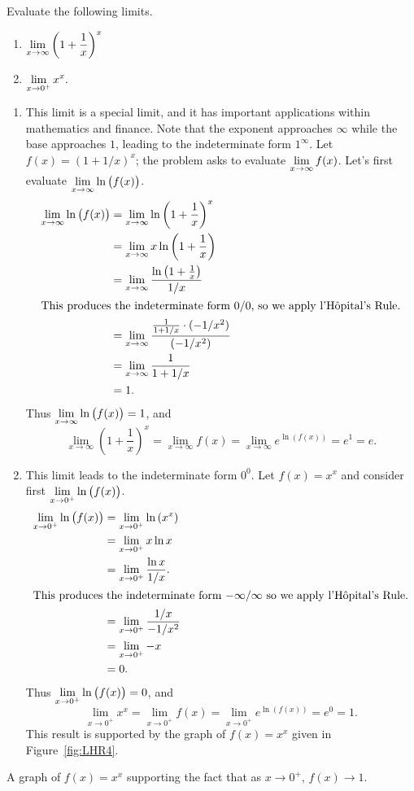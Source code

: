\begin{example} \label{Ex:3.7.Eg2}
Evaluate the following limits.
\bmtwo
\begin{enumerate}[1)]
\item $\displaystyle \lim_{x\to\infty} \left(1+\frac1x\right)^x $
\item $\displaystyle \lim_{x\to0^+} x^x.$
\end{enumerate}
\emtwo

\solution
\begin{enumerate}[1)]
\item	This limit is a special limit, and it has important applications within mathematics and finance. Note that the exponent approaches $\infty$ while the base approaches $1$, leading to the indeterminate form $1^\infty$. Let $f(x) = (1+1/x)^x$; the problem asks to evaluate $\displaystyle\lim_{x\to\infty}f(x)$. Let's first evaluate $\displaystyle \lim_{x\to\infty}\ln\big(f(x)\big)$.
\begin{align*}
\lim_{x\to\infty}\ln\big(f(x)\big) & = \lim_{x\to\infty} \ln \left(1+\frac1x\right)^x \\
			&= \lim_{x\to\infty} x\ln\left(1+\frac1x\right)\\
			&=  \lim_{x\to\infty} \frac{\ln\left(1+\frac1x\right)}{1/x}\\
			\intertext{This produces the indeterminate form $0/0$, so we apply l'H\^opital's Rule.}
			&=	\lim_{x\to\infty} \frac{\frac{1}{1+1/x}\cdot(-1/x^2)}{(-1/x^2)} \\
			&= \lim_{x\to\infty}\frac{1}{1+1/x}\\
			&= 1.
\end{align*}
Thus $\displaystyle\lim_{x\to\infty} \ln \big(f(x)\big) = 1$, and
$$\lim_{x\to\infty}\left(1+\frac1x\right)^x = \lim_{x\to\infty} f(x) =  \lim_{x\to\infty}e^{\ln (f(x))} = e^1 = e.$$

\item	This limit leads to the indeterminate form $0^0$. Let $f(x) = x^x$ and consider first $\displaystyle\lim_{x\to0^+} \ln\big(f(x)\big)$. 
\begin{align*}
\lim_{x\to0^+} \ln\big(f(x)\big) &= \lim_{x\to0^+} \ln\left(x^x\right) \\
			&= \lim_{x\to0^+} x\ln x \\
			&= \lim_{x\to0^+} \frac{\ln x}{1/x}.\\
			\intertext{This produces the indeterminate form $-\infty/\infty$ so we apply l'H\^opital's Rule.}
			&=	\lim_{x\to0^+} \frac{1/x}{-1/x^2} \\
			&= \lim_{x\to0^+} -x \\
			&= 0.
\end{align*}
Thus $\displaystyle\lim_{x\to0^+} \ln\big(f(x)\big) =0$, and
$$\lim_{x\to0^+} x^x = \lim_{x\to0^+} f(x) = \lim_{x\to0^+} e^{\ln(f(x))} = e^0 = 1.$$
This result is supported by the graph of $f(x)=x^x$ given in Figure~\ref{fig:LHR4}.
\end{enumerate}
\end{example}

\begin{marginfigure}[-6cm]
\caption{A graph of $f(x)=x^x$ supporting the fact that as $x\to 0^+$, $f(x)\to 1$.}\label{fig:LHR4}
\end{marginfigure}
